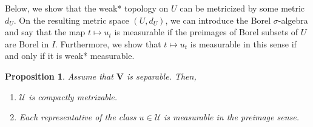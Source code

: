 \documentclass[sn-mathphys-num]{sn-jnl}
\numberwithin{equation}{section}
\theoremstyle{mythm}
\newtheorem{proposition}{Proposition}[section]
\theoremstyle{mydef}
\begin{document}
Below, we show that the weak* topology on \( U \) can be metricized by some metric \( d_U \). On the resulting metric space \( (U, d_U) \), we can introduce the Borel \( \sigma \)-algebra and say that the map \( t \mapsto u_t \) is measurable if the preimages of Borel subsets of \( U \) are Borel in \( I \). Furthermore, we show that \( t \mapsto u_t \) is measurable in this sense if and only if it is weak* measurable.


\begin{proposition}
   Assume that $\bm V$ is separable. Then, 
   \begin{enumerate}
    \item $\mathcal U$ is compactly metrizable.
    \item Each representative of the class $u \in \mathcal U$ is measurable in the preimage sense. 
   \end{enumerate}
\end{proposition}
\end{document}
